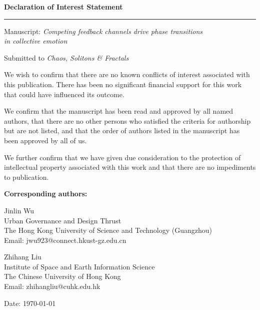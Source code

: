 \documentclass[11pt]{article}
\begin{document}
\begin{center}
  {\Large\bfseries Declaration of Interest Statement}

  \vspace{0.4em}

  \rule{0.6\textwidth}{0.4pt}

  \vspace{1.2em}

  {\large Manuscript: \textit{Competing feedback channels drive phase transitions\\in collective emotion}}

  \vspace{0.6em}

  {\normalsize Submitted to \textit{Chaos, Solitons \& Fractals}}
\end{center}

\vspace{2em}

\onehalfspacing

\noindent We wish to confirm that there are no known conflicts of interest associated with this publication. There has been no significant financial support for this work that could have influenced its outcome.

\vspace{0.8em}

\noindent We confirm that the manuscript has been read and approved by all named authors, that there are no other persons who satisfied the criteria for authorship but are not listed, and that the order of authors listed in the manuscript has been approved by all of us.

\vspace{0.8em}

\noindent We further confirm that we have given due consideration to the protection of intellectual property associated with this work and that there are no impediments to publication.

\vspace{3em}

\noindent\textbf{Corresponding authors:}

\vspace{0.6em}

\noindent Jinlin Wu\\
Urban Governance and Design Thrust\\
The Hong Kong University of Science and Technology (Guangzhou)\\
Email: jwu923@connect.hkust-gz.edu.cn

\vspace{0.8em}

\noindent Zhihang Liu\\
Institute of Space and Earth Information Science\\
The Chinese University of Hong Kong\\
Email: zhihangliu@cuhk.edu.hk

\vspace{1em}

\noindent Date: \today
\end{document}
